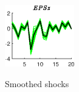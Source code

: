  
\begin{figure}[H]
\centering 
\includegraphics[width=0.27\textwidth]{RBC_kz/Output/RBC_kz_SmoothedShocks_EPSz}
\label{Fig:SmoothedShocks:EPSz}
\caption{Smoothed shocks}
\end{figure}
 
